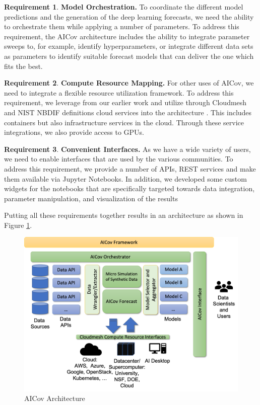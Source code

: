 \documentclass[12pt]{article}
\theoremstyle{definition}
\newtheorem{requirement}{Requirement}
\renewcommand{\_}{%
    \textunderscore\hspace{0pt}%
}
\begin{document}
\begin{requirement}{\bf Model Orchestration.}
  To coordinate the different model predictions and the generation of
  the deep learning forecasts, we need the ability to orchestrate them
  while applying a number of parameters. \Solution To address this
  requirement, the AICov architecture includes the ability to
  integrate parameter sweeps to, for example, identify
  hyperparameters, or integrate different data sets as parameters to
  identify suitable forecast models that can deliver the one which
  fits the best.
\end{requirement}

\begin{requirement}{\bf Compute Resource Mapping.}
  For other uses of AICov, we need to integrate a flexible resource
  utilization framework. \Solution To address this requirement, we
  leverage from our earlier work and utilize through Cloudmesh and
  NIST NBDIF definitions cloud services into the architecture
  \cite{las-19-nist}. This includes containers but also infrastructure
  services in the cloud. Through these service integrations, we also
  provide access to GPUs.
\end{requirement}

\begin{requirement}{\bf Convenient Interfaces.}
  As we have a wide variety of users, we need to enable interfaces
  that are used by the various communities. \Solution To address this
  requirement, we provide a number of APIs, REST services and make
  them available via Jupyter Notebooks. In addition, we developed some
  custom widgets for the notebooks that are specifically targeted
  towards data integration, parameter manipulation, and visualization
  of the results
\end{requirement}


Putting all these requirements together results in an architecture as
shown in Figure \ref{fig:arch}.\\

\begin{figure}[h!]
    \centering
    \includegraphics[width=0.6\columnwidth]{images/arch.pdf}
    \caption{AICov Architecture}
    \label{fig:arch}
\end{figure}
\end{document}
